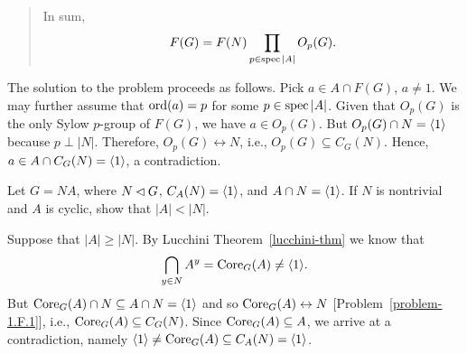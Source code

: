 \begin{solution}
\begin{enumerate}[a),font=\upshape]
\begin{quote}
        In sum,
        $$
            F(G) = F(N)\prod_{p\in\operatorname{spec}|A|}O_p(G).
        $$
        \end{quote}
    
    The solution to the problem proceeds as follows. Pick $a\in A\cap F(G)$, $a\ne1$. We may further assume that ${\rm ord}(a)=p$ for some $p\in\operatorname{spec}|A|$. Given that $O_p(G)$ is the only Sylow $p$-group of $F(G)$, we have $a\in O_p(G)$. But $O_p(G)\cap N=\langle1\rangle$ because $p\perp|N|$. Therefore, $O_p(G)\leftrightarrow N$, i.e., $O_p(G)\subseteq C_G(N)$. Hence, $a\in A\cap C_G(N)=\langle1\rangle$, a contradiction.
\end{enumerate}
\end{solution}

\begin{probl}
    Let\/ $G=NA$, where\/ $N\lhd G$, $C_A(N)=\langle1\rangle$, and\/ $A\cap N=\langle1\rangle$. If\/ $N$ is nontrivial and\/ $A$ is cyclic, show that\/ $|A|<|N|$.
\end{probl}

\begin{solution} Suppose that $|A|\ge|N|$. By Lucchini Theorem~\ref{lucchini-thm} we know that
$$
    \bigcap_{y\in N}A^y={\rm Core}_G(A)\ne\langle1\rangle.
$$
But ${\rm Core}_G(A)\cap N\subseteq A\cap N=\langle1\rangle$ and so ${\rm Core}_G(A)\leftrightarrow N$ [Problem~\ref{problem-1.F.1}], i.e., ${\rm Core}_G(A)\subseteq C_G(N)$. Since ${\rm Core}_G(A)\subseteq A$, we arrive at a contradiction, namely $\langle1\rangle\ne{\rm Core}_G(A)\subseteq C_A(N)=\langle1\rangle$.  \end{solution}
